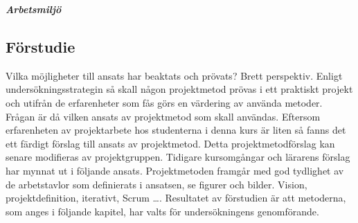 \documentclass[conference]{IEEEtran}
\begin{document}
\textit{\textbf{Arbetsmiljö}}

\subsection{Förstudie}
Vilka möjligheter till ansats har beaktats och prövats? Brett perspektiv.
Enligt undersökningsstrategin så skall någon projektmetod prövas i ett 
praktiskt projekt och utifrån de erfarenheter som fås görs en värdering
av använda metoder. Frågan är då vilken ansats av projektmetod som skall 
användas. Eftersom erfarenheten av projektarbete hos studenterna i denna 
kurs är liten så fanns det ett färdigt förslag till ansats av projektmetod. 
Detta projektmetodförslag kan senare modifieras av projektgruppen.
Tidigare kursomgångar och lärarens förslag har mynnat ut i följande ansats.
Projektmetoden framgår med god tydlighet av de arbetstavlor som definierats 
i ansatsen, se figurer och bilder.
Vision, projektdefinition, iterativt, Scrum ….
Resultatet av förstudien är att metoderna, som anges i följande kapitel,
har valts för undersökningens genomförande.\\
\end{document}
